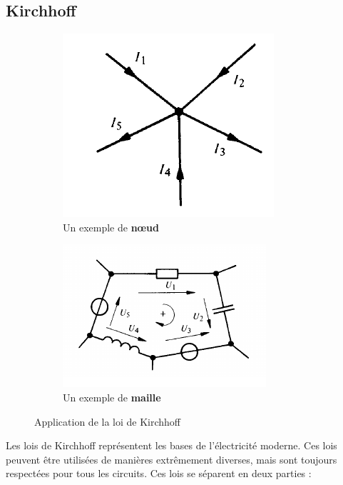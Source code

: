 \documentclass[12pt,a4paper]{article}
\begin{document}
\subsection{Kirchhoff}
\begin{figure}
	\centering
	\begin{subfigure}[b]{0.45\textwidth}
		\centering
		\includegraphics[scale=0.5]{images/kirchhoff_noeud}
		\caption{Un exemple de \textbf{n\oe ud}}
		\label{subfig: kirchhoff noeud}
	\end{subfigure}
	\begin{subfigure}[b]{0.45\textwidth}
		\centering
		\includegraphics[scale=0.5]{images/kirchhoff_maille}
		\caption{Un exemple de \textbf{maille}}
		\label{subfig: kirchhoff maille}
	\end{subfigure}
	\caption{Application de la loi de Kirchhoff}
\end{figure}
Les lois de Kirchhoff représentent les bases de l'électricité moderne. Ces lois peuvent être utilisées de manières extrêmement diverses, mais sont toujours respectées pour tous les circuits. Ces lois se séparent en deux parties :
\end{document}

